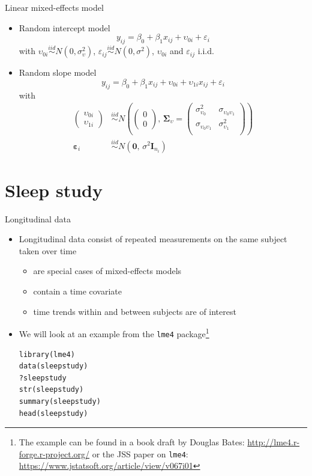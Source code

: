 \documentclass[aspectratio=169]{beamer}
\newcommand{\vect}[1]{\mathbf{#1}}
\newcommand{\mat}[1]{\mathbf{#1}}
\newcommand{\gvect}[1]{\boldsymbol{#1}}
\newcommand{\gmat}[1]{\boldsymbol{#1}}
\begin{document}
\begin{frame}{Linear mixed-effects model}
\begin{itemize}
  \item Random intercept model
\[y_{ij} = \beta_0 + \beta_1 x_{ij} + \upsilon_{0i} + \varepsilon_i\]
with $\upsilon_{0i} \overset{iid}{\sim} N(0, \sigma^2_{\upsilon})$,
$\varepsilon_{ij} \overset{iid}{\sim} N(0, \sigma^2)$, $\upsilon_{0i}$ and
$\varepsilon_{ij}$ i.i.d.\\[2ex]
  \item Random slope model
\[y_{ij} = \beta_0 + \beta_1 x_{ij} + \upsilon_{0i} + \upsilon_{1i} x_{ij} + \varepsilon_i\]
with
\begin{align*}
  \begin{pmatrix} \upsilon_{0i}\\ \upsilon_{1i} \end{pmatrix} & \overset{iid}{\sim}
    N \left(\begin{pmatrix} 0\\ 0 \end{pmatrix}, \, \gmat{\Sigma}_\upsilon =
      \begin{pmatrix}
        \sigma^2_{\upsilon_0} & \sigma_{\upsilon_0 \upsilon_1} \\
        \sigma_{\upsilon_0 \upsilon_1} & \sigma^2_{\upsilon_1} \\
      \end{pmatrix} \right) \\
  \gvect{\varepsilon}_i & \overset{iid}{\sim} N(\vect{0}, \, \sigma^2 \mat{I}_{n_i})
\end{align*}
\end{itemize}
\end{frame}

\section{Sleep study}

\begin{frame}[fragile]{Longitudinal data}
  \begin{itemize}
    \item Longitudinal data consist of repeated measurements on the same
      subject taken over time
  \begin{itemize}
    \item are special cases of mixed-effects models
    \item contain a time covariate
    \item time trends within and between subjects are of interest
  \end{itemize}
\item We will look at an example from the \texttt{lme4}
  package\footnote{The example can be found in a book draft by Douglas
      Bates: \url{http://lme4.r-forge.r-project.org/} or the JSS paper on
      \texttt{lme4}: \url{https://www.jstatsoft.org/article/view/v067i01}}
  \begin{lstlisting}
library(lme4)
data(sleepstudy)
?sleepstudy
str(sleepstudy)
summary(sleepstudy)
head(sleepstudy)
  \end{lstlisting}
  \end{itemize}
\nocite{Bates2010lme4, Bates2015}
\end{frame}
\end{document}
